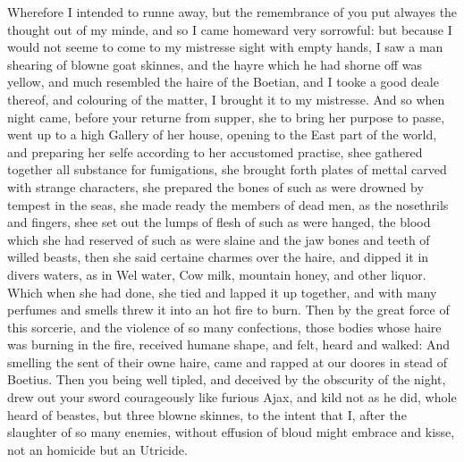 Wherefore I intended to runne away, but the remembrance of you put alwayes the
thought out of my minde, and so I came homeward very sorrowful: but because I
would not seeme to come to my mistresse sight with empty hands, I saw a man
shearing of blowne goat skinnes, and the hayre which he had shorne off was
yellow, and much resembled the haire of the Boetian, and I tooke a good deale
thereof, and colouring of the matter, I brought it to my mistresse. And so when
night came, before your returne from supper, she to bring her purpose to passe,
went up to a high Gallery of her house, opening to the East part of the world,
and preparing her selfe according to her accustomed practise, shee gathered
together all substance for fumigations, she brought forth plates of mettal
carved with strange characters, she prepared the bones of such as were drowned
by tempest in the seas, she made ready the members of dead men, as the
nosethrils and fingers, shee set out the lumps of flesh of such as were hanged,
the blood which she had reserved of such as were slaine and the jaw bones and
teeth of willed beasts, then she said certaine charmes over the haire, and
dipped it in divers waters, as in Wel water, Cow milk, mountain honey, and
other liquor. Which when she had done, she tied and lapped it up together, and
with many perfumes and smells threw it into an hot fire to burn. Then by the
great force of this sorcerie, and the violence of so many confections, those
bodies whose haire was burning in the fire, received humane shape, and felt,
heard and walked: And smelling the sent of their owne haire, came and rapped at
our doores in stead of Boetius. Then you being well tipled, and deceived by the
obscurity of the night, drew out your sword courageously like furious Ajax, and
kild not as he did, whole heard of beastes, but three blowne skinnes, to the
intent that I, after the slaughter of so many enemies, without effusion of
bloud might embrace and kisse, not an homicide but an Utricide.

